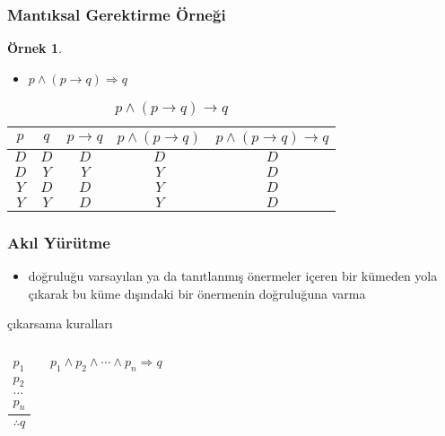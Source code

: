 \documentclass[dvipsnames]{beamer}
\theoremstyle{definition}
\theoremstyle{example}
\newtheorem{ornek}[theorem]{Örnek}
\theoremstyle{plain}
\begin{document}
\begin{frame}
  \frametitle{Mantıksal Gerektirme Örneği}

  \begin{ornek}
    \begin{itemize}
      \item $p \wedge (p \rightarrow q) \Rightarrow q$
    \end{itemize}

    \begin{table}
      \caption{$p \wedge (p \rightarrow q) \rightarrow q$}
      \begin{tabular}{|c|c|c|c||c|}\hline
        $p$ & $q$ & $p \rightarrow q$ & $p \wedge (p \rightarrow q)$
            & $p \wedge (p \rightarrow q) \rightarrow q$\\\hline\hline
        $D$ & $D$ & $D$ & $D$ & $D$\\\hline
        $D$ & $Y$ & $Y$ & $Y$ & $D$\\\hline
        $Y$ & $D$ & $D$ & $Y$ & $D$\\\hline
        $Y$ & $Y$ & $D$ & $Y$ & $D$\\\hline
      \end{tabular}
    \end{table}
  \end{ornek}
\end{frame}

\begin{frame}
  \frametitle{Akıl Yürütme}

  \begin{itemize}
    \item doğruluğu varsayılan ya da tanıtlanmış önermeler içeren bir kümeden
      yola çıkarak bu küme dışındaki bir önermenin doğruluğuna varma
  \end{itemize}

  \pause
  \begin{block}{çıkarsama kuralları}
    \begin{columns}
      \[
      \frac
        {
          \begin{array}{c}
            p_1\\
            p_2\\
            \dots\\
            p_n
          \end{array}
        }
        {
          \therefore q
        }
      \]

      $p_1 \wedge p_2 \wedge \cdots \wedge p_n \Rightarrow q$
    \end{columns}
  \end{block}
\end{frame}
\end{document}

